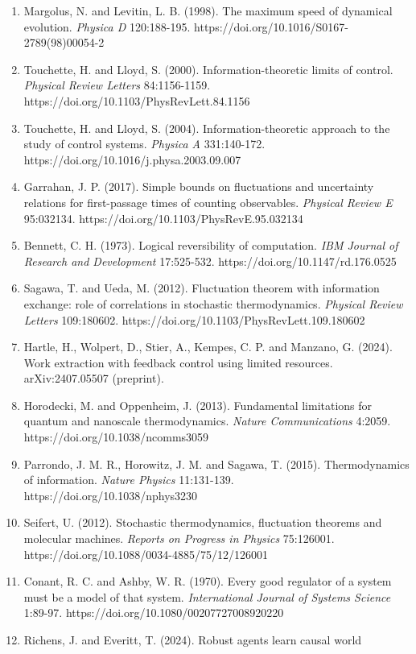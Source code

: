 \documentclass[
  10pt,
]{article}
\begin{document}
\begin{enumerate}
\item
  Margolus, N. and Levitin, L. B. (1998). The maximum speed of dynamical
  evolution. \emph{Physica D} 120:188-195.
  https://doi.org/10.1016/S0167-2789(98)00054-2
\item
  Touchette, H. and Lloyd, S. (2000). Information-theoretic limits of
  control. \emph{Physical Review Letters} 84:1156-1159.
  https://doi.org/10.1103/PhysRevLett.84.1156
\item
  Touchette, H. and Lloyd, S. (2004). Information-theoretic approach to
  the study of control systems. \emph{Physica A} 331:140-172.
  https://doi.org/10.1016/j.physa.2003.09.007
\item
  Garrahan, J. P. (2017). Simple bounds on fluctuations and uncertainty
  relations for first-passage times of counting observables.
  \emph{Physical Review E} 95:032134.
  https://doi.org/10.1103/PhysRevE.95.032134
\item
  Bennett, C. H. (1973). Logical reversibility of computation. \emph{IBM
  Journal of Research and Development} 17:525-532.
  https://doi.org/10.1147/rd.176.0525
\item
  Sagawa, T. and Ueda, M. (2012). Fluctuation theorem with information
  exchange: role of correlations in stochastic thermodynamics.
  \emph{Physical Review Letters} 109:180602.
  https://doi.org/10.1103/PhysRevLett.109.180602
\item
  Hartle, H., Wolpert, D., Stier, A., Kempes, C. P. and Manzano, G.
  (2024). Work extraction with feedback control using limited resources.
  arXiv:2407.05507 (preprint).
\item
  Horodecki, M. and Oppenheim, J. (2013). Fundamental limitations for
  quantum and nanoscale thermodynamics. \emph{Nature Communications}
  4:2059. https://doi.org/10.1038/ncomms3059
\item
  Parrondo, J. M. R., Horowitz, J. M. and Sagawa, T. (2015).
  Thermodynamics of information. \emph{Nature Physics} 11:131-139.
  https://doi.org/10.1038/nphys3230
\item
  Seifert, U. (2012). Stochastic thermodynamics, fluctuation theorems
  and molecular machines. \emph{Reports on Progress in Physics}
  75:126001. https://doi.org/10.1088/0034-4885/75/12/126001
\item
  Conant, R. C. and Ashby, W. R. (1970). Every good regulator of a
  system must be a model of that system. \emph{International Journal of
  Systems Science} 1:89-97. https://doi.org/10.1080/00207727008920220
\item
  Richens, J. and Everitt, T. (2024). Robust agents learn causal world

\end{enumerate}
\end{document}
